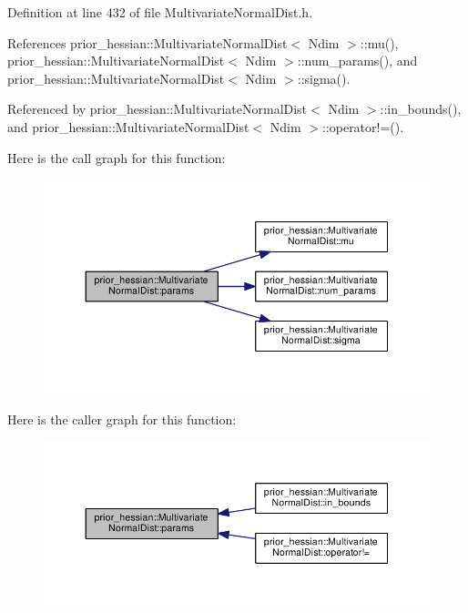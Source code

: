 Definition at line 432 of file Multivariate\+Normal\+Dist.\+h.



References prior\+\_\+hessian\+::\+Multivariate\+Normal\+Dist$<$ Ndim $>$\+::mu(), prior\+\_\+hessian\+::\+Multivariate\+Normal\+Dist$<$ Ndim $>$\+::num\+\_\+params(), and prior\+\_\+hessian\+::\+Multivariate\+Normal\+Dist$<$ Ndim $>$\+::sigma().



Referenced by prior\+\_\+hessian\+::\+Multivariate\+Normal\+Dist$<$ Ndim $>$\+::in\+\_\+bounds(), and prior\+\_\+hessian\+::\+Multivariate\+Normal\+Dist$<$ Ndim $>$\+::operator!=().



Here is the call graph for this function\+:\nopagebreak
\begin{figure}[H]
\begin{center}
\leavevmode
\includegraphics[width=350pt]{classprior__hessian_1_1MultivariateNormalDist_a55a53ff4ea86375a8971a5334c000c9c_cgraph}
\end{center}
\end{figure}




Here is the caller graph for this function\+:\nopagebreak
\begin{figure}[H]
\begin{center}
\leavevmode
\includegraphics[width=350pt]{classprior__hessian_1_1MultivariateNormalDist_a55a53ff4ea86375a8971a5334c000c9c_icgraph}
\end{center}
\end{figure}


